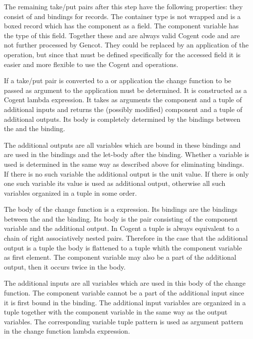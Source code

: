 The remaining take/put pairs after this step have the following properties: they consist of  and  bindings
for records. The container type is not  wrapped and is a boxed record which has the component as a field. The
component variable has the type of this field. Together these  and  are always valid Cogent code and are
not further processed by Gencot. They could be replaced by an application of the  operation, but since that must
be defined specifically for the accessed field it is easier and more flexible to use the Cogent  and 
operations.

If a take/put pair is converted to a  or  application the change function to be passed as argument
to the application must be determined. It is constructed as a Cogent lambda expression. It takes as arguments the component
and a tuple of additional inputs and returns the (possibly modified) component and a tuple of additional outputs. Its body
is completely determined by the bindings between the  and the  binding.

The additional outputs are all variables which are bound in these bindings and are used in the bindings and the let-body after
the  binding. Whether a variable is used is determined in the same way as described above for eliminating 
bindings. If there is no such variable the additional output is the unit value. If there is only one such variable its value
is used as additional output, otherwise all such variables organized in a tuple in some order.

The body of the change function is a  expression. Its bindings are the bindings between the  and the
 binding. Its body is the pair consisting of the component variable and the additional output. In Cogent a
tuple is always equivalent to a chain of right associatively nested pairs. Therefore in the case that the additional output
is a tuple the body is flattened to a tuple whith the component variable as first element. The component variable may also
be a part of the additional output, then it occurs twice in the body.

The additional inputs are all variables which are used in this body of the change function. The component variable cannot
be a part of the additional input since it is first bound in the  binding. The additional input variables are
organized in a tuple together with the component variable in the same way as the output variables. The corresponding variable
tuple pattern is used as argument pattern in the change function lambda expression.

